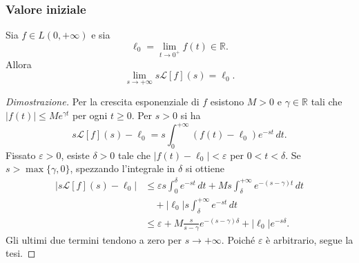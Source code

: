             \subsubsection{Valore iniziale}
                Sia $f \in L(0,+\infty)$ e sia
                \[
                    \ell_0=\lim_{t\rightarrow0^+}f(t)\in\mathbb{R}.
                \]
                Allora
                \[
                    \lim_{s\rightarrow+\infty}s\mathcal{L}[f](s)=\ell_0.
                \]
                \begin{proof}[Dimostrazione]
                    Per la crescita esponenziale di $f$ esistono $M>0$ e
                    $\gamma\in\mathbb{R}$ tali che
                    $\lvert f(t)\rvert\leq Me^{\gamma t}$ per ogni $t\geq0$.
                    Per $s>0$ si ha
                    \[
                        s\mathcal{L}[f](s)-\ell_0
                        =s\int_0^{+\infty}(f(t)-\ell_0)e^{-st}\,dt.
                    \]
                    Fissato $\varepsilon>0$, esiste $\delta>0$ tale che
                    $\lvert f(t)-\ell_0\rvert<\varepsilon$ per
                    $0<t<\delta$. Se $s>\max\{\gamma,0\}$, spezzando
                    l'integrale in $\delta$ si ottiene
                    \begin{align*}
                        \lvert s\mathcal{L}[f](s)-\ell_0\rvert
                        &\leq \varepsilon s\int_0^\delta e^{-st}\,dt
                        +Ms\int_\delta^{+\infty}e^{-(s-\gamma)t}\,dt \\
                        &\quad+\lvert\ell_0\rvert s
                        \int_\delta^{+\infty}e^{-st}\,dt \\
                        &\leq \varepsilon
                        +M\frac{s}{s-\gamma}e^{-(s-\gamma)\delta}
                        +\lvert\ell_0\rvert e^{-s\delta}.
                    \end{align*}
                    Gli ultimi due termini tendono a zero per
                    $s\rightarrow+\infty$. Poiché $\varepsilon$ è
                    arbitrario, segue la tesi.
                \end{proof}


